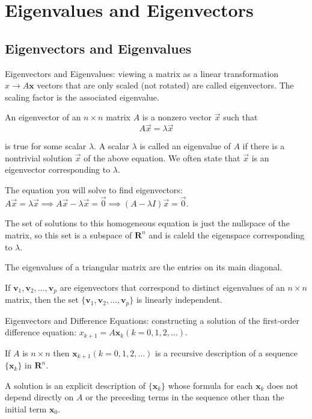 \documentclass[../linalg.tex]{subfiles}
\begin{document}
\chapter{Eigenvalues and Eigenvectors}
\section{Eigenvectors and Eigenvalues}
Eigenvectors and Eigenvalues: viewing a matrix as a linear transformation $x\rightarrow A\textbf{x}$ vectors that are only scaled (not rotated) are called eigenvectors. The scaling factor is the associated eigenvalue.

\begin{definition}
    An eigenvector of an $n\times n$ matrix $A$ is a nonzero vector $\vec{x}$ such that 
    \[ A\vec{x} = \lambda \vec{x} \]
\end{definition}
is true for some scalar $\lambda$. A scalar $\lambda$ is called an eigenvalue of $A$ if there is a nontrivial solution $\vec{x}$ of the above equation. We often state that 
$\vec{x}$ is an eigenvector corresponding to $\lambda$.

The equation you will solve to find eigenvectors: $A\vec{x}=\lambda\vec{x}\implies A\vec{x}-\lambda\vec{x}=\vec{0}\implies (A-\lambda I)\vec{x}=\vec{0}$.

The set of solutions to this homogeneous equation is just the nullspace of the matrix, so this set is a subspace of $\textbf{R}^n$ and is caleld the eigenspace corresponding to $\lambda$.

\begin{theorem}
    The eigenvalues of a triangular matrix are the entries on its main diagonal.
\end{theorem}

\begin{theorem}
    If $\textbf{v}_1,\textbf{v}_2,\dots,\textbf{v}_p$ are eigenvectors that correspond to distinct eigenvalues of an $n\times n$ matrix, then the set 
    $\{\textbf{v}_1,\textbf{v}_2,\dots,\textbf{v}_p\}$ is linearly independent.
\end{theorem}

Eigenvectors and Difference Equations: constructing a solution of the first-order difference equation: $x_{k+1}=A\textbf{x}_k (k=0,1,2,\dots)$.

If $A$ is $n\times n$ then $\textbf{x}_{k+1} (k=0,1,2,\dots)$ is a recursive description of a sequence $\{\textbf{x}_k\}$ in $\textbf{R}^n$.

A solution is an explicit description of $\{\textbf{x}_k\}$ whose formula for each $\textbf{x}_k$ does not depend directly on $A$ or the preceding terms in the sequence other than the initial term $\textbf{x}_0$.
\end{document}
